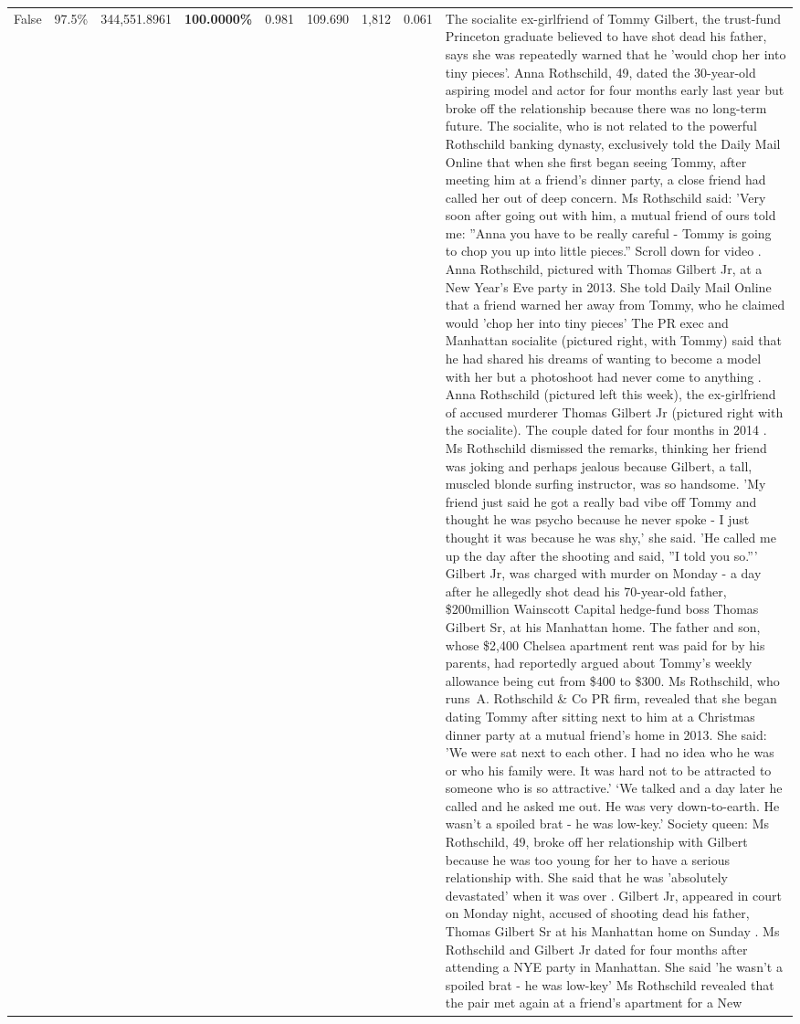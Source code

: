 \begin{table}[H]
\begin{tabular}{lllrlllll}
False & 97.5\% & 344,551.8961 & \bfseries \color{red} 100.0000\% & 0.981 & 109.690 & 1,812 & 0.061 & The socialite ex-girlfriend of Tommy Gilbert, the trust-fund Princeton graduate believed to have shot dead his father, says she was repeatedly warned that he 'would chop her into tiny pieces'. Anna Rothschild, 49, dated the 30-year-old aspiring model and actor for four months early last year but broke off the relationship because there was no long-term future. The socialite, who is not related to the powerful Rothschild banking dynasty, exclusively told the Daily Mail Online that when she first began seeing Tommy, after meeting him at a friend's dinner party, a close friend had called her out of deep concern. Ms Rothschild said: 'Very soon after going out with him, a mutual friend of ours told me: ''Anna you have to be really careful - Tommy is going to chop you up into little pieces.'' Scroll down for video . Anna Rothschild, pictured with Thomas Gilbert Jr, at a New Year's Eve party in 2013. She told Daily Mail Online that a friend warned her away from Tommy, who he claimed would 'chop her into tiny pieces' The PR exec and Manhattan socialite (pictured right, with Tommy) said that he had shared his dreams of wanting to become a model with her but a photoshoot had never come to anything . Anna Rothschild (pictured left this week), the ex-girlfriend of accused murderer Thomas Gilbert Jr (pictured right with the socialite). The couple dated for four months in 2014 . Ms Rothschild dismissed the remarks, thinking her friend was joking and perhaps jealous because Gilbert, a tall, muscled blonde surfing instructor, was so handsome. 'My friend just said he got a really bad vibe off Tommy and thought he was psycho because he never spoke - I just thought it was because he was shy,' she said. 'He called me up the day after the shooting and said, ''I told you so.''' Gilbert Jr, was charged with murder on Monday - a day after he allegedly shot dead his 70-year-old father, \$200million Wainscott Capital hedge-fund boss Thomas Gilbert Sr, at his Manhattan home. The father and son, whose \$2,400 Chelsea apartment rent was paid for by his parents, had reportedly argued about Tommy's weekly allowance being cut from \$400 to \$300. Ms Rothschild, who runs A. Rothschild \& Co PR firm, revealed that she began dating Tommy after sitting next to him at a Christmas dinner party at a mutual friend's home in 2013. She said: 'We were sat next to each other. I had no idea who he was or who his family were. It was hard not to be attracted to someone who is so attractive.' ‘We talked and a day later he called and he asked me out. He was very down-to-earth. He wasn’t a spoiled brat - he was low-key.’ Society queen: Ms Rothschild, 49, broke off her relationship with Gilbert because he was too young for her to have a serious relationship with. She said that he was 'absolutely devastated' when it was over . Gilbert Jr, appeared in court on Monday night, accused of shooting dead his father, Thomas Gilbert Sr at his Manhattan home on Sunday . Ms Rothschild and Gilbert Jr dated for four months after attending a NYE party in Manhattan. She said 'he wasn't a spoiled brat - he was low-key' Ms Rothschild revealed that the pair met again at a friend’s apartment for a New 
\end{tabular}
\end{table}
